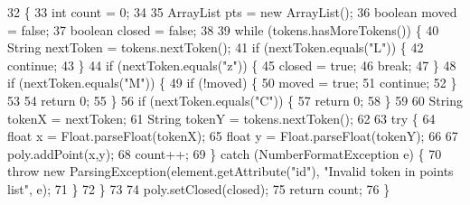 \begin{DoxyCode}
32                                                                                                            
             \{
33         \textcolor{keywordtype}{int} count = 0;
34         
35         ArrayList pts = \textcolor{keyword}{new} ArrayList();
36         \textcolor{keywordtype}{boolean} moved = \textcolor{keyword}{false};
37         \textcolor{keywordtype}{boolean} closed = \textcolor{keyword}{false};
38         
39         \textcolor{keywordflow}{while} (tokens.hasMoreTokens()) \{
40             String nextToken = tokens.nextToken();
41             \textcolor{keywordflow}{if} (nextToken.equals(\textcolor{stringliteral}{"L"})) \{
42                 \textcolor{keywordflow}{continue};
43             \}
44             \textcolor{keywordflow}{if} (nextToken.equals(\textcolor{stringliteral}{"z"})) \{
45                 closed = \textcolor{keyword}{true};
46                 \textcolor{keywordflow}{break};
47             \}
48             \textcolor{keywordflow}{if} (nextToken.equals(\textcolor{stringliteral}{"M"})) \{
49                 \textcolor{keywordflow}{if} (!moved) \{
50                     moved = \textcolor{keyword}{true};
51                     \textcolor{keywordflow}{continue};
52                 \}
53                 
54                 \textcolor{keywordflow}{return} 0;
55             \}
56             \textcolor{keywordflow}{if} (nextToken.equals(\textcolor{stringliteral}{"C"})) \{
57                 \textcolor{keywordflow}{return} 0;
58             \}
59             
60             String tokenX = nextToken;
61             String tokenY = tokens.nextToken();
62             
63             \textcolor{keywordflow}{try} \{
64                 \textcolor{keywordtype}{float} x = Float.parseFloat(tokenX);
65                 \textcolor{keywordtype}{float} y = Float.parseFloat(tokenY);
66                 
67                 poly.addPoint(x,y);
68                 count++;
69             \} \textcolor{keywordflow}{catch} (NumberFormatException e) \{
70                 \textcolor{keywordflow}{throw} \textcolor{keyword}{new} ParsingException(element.getAttribute(\textcolor{stringliteral}{"id"}), \textcolor{stringliteral}{"Invalid token in points list"}, e);
71             \}
72         \}
73         
74         poly.setClosed(closed);
75         \textcolor{keywordflow}{return} count;
76     \}
\end{DoxyCode}
